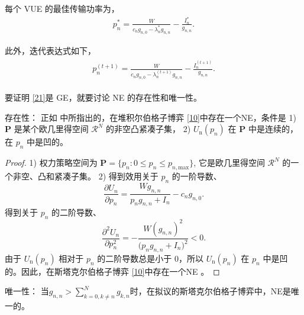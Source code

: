 每个 VUE 的最佳传输功率为，
\begin{equation}\label{21}
\begin{array}{*{21}{ll}}
 p_n^{*}=\frac{W}{c_n g_{n,0}-\lambda_n^{*}g_{n,n}}-\frac{I_n^{*}}{g_{n,n}}.
\end{array}
\end{equation}

此外，迭代表达式如下，
\begin{eqnarray}\label{22}
 \begin{array}{lll}
p_n^{(t+1)}=\frac{W}{c_n g_{n,0}-\lambda_n^{(t+1)}g_{n,n}}-\frac{I_n^{(t+1)}}{g_{n,n}}.
\end{array}
\end{eqnarray}

要证明 \eqref{21}是 GE，就要讨论 NE 的存在性和唯一性。

存在性： 正如 \cite{GT} 中所指出的，在堆积尔伯格子博弈 \eqref{10}中存在一个NE，条件是
1) $\mathbf{P}$ 是某个欧几里得空间 $\mathcal{R}^N$ 的非空凸紧凑子集， 2) $U_{\textrm{n}}(p_n)$ 在 $\mathbf{P}$ 中是连续的，在 $p_n$ 中是凹的。

\begin{proof}
1) 权力策略空间为 $\mathbf{P}=\{p_n:0\leq p_n \leq p_{n,\textrm{max}}\}$, 它是欧几里得空间 $\mathcal{R}^N$ 的一个非空、凸和紧凑子集。
2) 得到效用关于 $p_n$ 的一阶导数、
\begin{equation}\label{23}
\frac{\partial U_{n}}{\partial p_n}=\frac{Wg_{n,n}}{p_n g_{n,n}+I_n}-c_ng_{n,0}.
\end{equation}
得到关于 $p_n$ 的二阶导数、
\begin{equation}\label{24}
\frac{\partial^2 U_{n}}{\partial p_n^2}=-\frac{W(g_{n,n})^2}{\big(p_n g_{n,n} +I_n\big)^2}<0.
\end{equation}
由于 $U_{\textrm{n}}(p_n)$ 相对于 $p_n$ 的二阶导数总是小于 0，所以 $U_{\textrm{n}}(p_n)$ 在 $p_n$ 中是凹的。因此，在斯塔克尔伯格子博弈 \ref{10}中存在一个NE 。
\end{proof}\par

唯一性： 当$g_{n,n}$$>$$\sum\limits_{k=0,k\neq n}^N g_{k,n}$时，在拟议的斯塔克尔伯格子博弈中，NE是唯一的。

